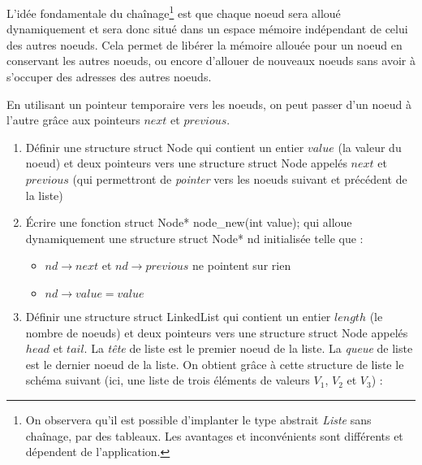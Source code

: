 \documentclass[../../../main.tex]{subfiles}
\begin{document}
L'idée fondamentale du chaînage\footnote{On observera qu'il est possible d'implanter le type abstrait \textit{Liste} sans chaînage, par des tableaux. Les avantages et inconvénients sont différents et dépendent de l'application.} est que chaque noeud sera alloué dynamiquement et sera donc situé dans un espace mémoire indépendant de celui des autres noeuds. Cela permet de libérer la mémoire allouée pour un noeud en conservant les autres noeuds, ou encore d'allouer de nouveaux noeuds sans avoir à s'occuper des adresses des autres noeuds.

En utilisant un pointeur temporaire vers les noeuds, on peut passer d'un noeud à l'autre grâce aux pointeurs $next$ et $previous$.
\begin{enumerate}
	\item Définir une structure \textsf{struct Node} qui contient un entier $value$ (la valeur du noeud) et deux pointeurs vers une structure \textsf{struct Node} appelés $next$ et $previous$ (qui permettront de \textit{pointer} vers les noeuds suivant et précédent de la liste)
	\item Écrire une fonction \textsf{struct Node* node\_new(int value);} qui alloue dynamiquement une structure \textsf{struct Node* nd} initialisée telle que :
	\begin{itemize}
		\item $nd\rightarrow next$ et $nd\rightarrow previous$ ne pointent sur rien
		\item $nd\rightarrow value = value$
	\end{itemize}
	\item Définir une structure \textsf{struct LinkedList} qui contient un entier $length$ (le nombre de noeuds) et deux pointeurs vers une structure \textsf{struct Node} appelés $head$ et $tail$. La \textit{tête} de liste est le premier noeud de la liste. La \textit{queue} de liste est le dernier noeud de la liste. On obtient grâce à cette structure de liste le schéma suivant (ici, une liste de trois éléments de valeurs $V_{1}$, $V_{2}$ et $V_{3}$) :


\end{enumerate}
\end{document}
